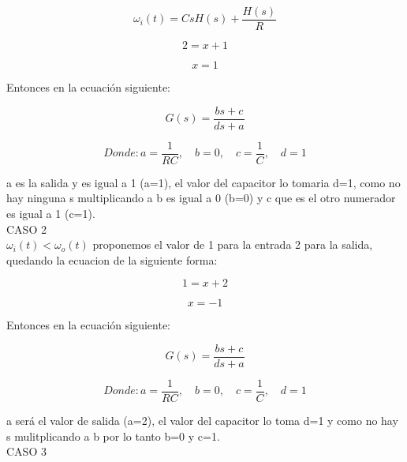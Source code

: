\documentclass{report}
\begin{document}
	\begin{equation*}
		\omega_i(t)=CsH(s)+\frac{H(s)}{R}
	\end{equation*}
	
	\begin{equation*}
		2=x+1
	\end{equation*}
				
	\begin{equation*}
		x=1
	\end{equation*}		
	
	Entonces en la ecuación siguiente:
	
	\begin{equation*}
		G(s)=\frac{bs+c}{ds+a}
	\end{equation*}
	
	\begin{equation*}
		Donde:
		a=\frac{1}{RC},\quad b=0,\quad c=\frac{1}{C},\quad d=1
	\end{equation*}
		
	a es la salida y es igual a 1 (a=1), el valor del capacitor lo tomaria d=1, como no hay ninguna s multiplicando a b es igual a 0 (b=0) y c que es el otro numerador es igual a 1 (c=1).\\
	
	CASO 2\\
	
	$\omega_i(t) < \omega_o(t)$ proponemos el valor de 1 para la entrada 2 para la salida, quedando la ecuacion de la siguiente forma:
	
	\begin{equation*}
		1=x+2
	\end{equation*}
	
	\begin{equation*}
		x=-1
	\end{equation*}	
	
	Entonces en la ecuación siguiente:
	
	\begin{equation*}
	G(s)=\frac{bs+c}{ds+a}
	\end{equation*}
	
	\begin{equation*}
	Donde:
	a=\frac{1}{RC},\quad b=0,\quad c=\frac{1}{C},\quad d=1
	\end{equation*}
	
	a será el valor de salida (a=2), el valor del capacitor lo toma d=1 y como no hay s mulitplicando a b por lo tanto b=0 y c=1.\\
	
	CASO 3\\
	
\end{document}
